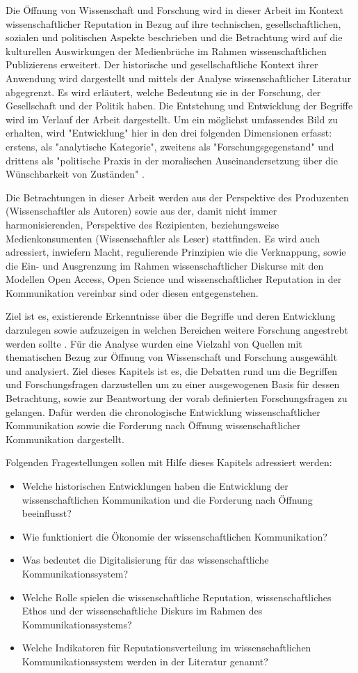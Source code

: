 Die Öffnung von Wissenschaft und Forschung wird in dieser Arbeit im Kontext wissenschaftlicher Reputation in Bezug auf ihre technischen, gesellschaftlichen, sozialen und politischen Aspekte beschrieben und die Betrachtung wird auf die kulturellen Auswirkungen der Medienbrüche im Rahmen wissenschaftlichen Publizierens erweitert. Der historische und gesellschaftliche Kontext ihrer Anwendung wird dargestellt und mittels der Analyse wissenschaftlicher Literatur abgegrenzt. Es wird erläutert, welche Bedeutung sie in der Forschung, der Gesellschaft und der Politik haben. Die Entstehung und Entwicklung der Begriffe wird im Verlauf der Arbeit dargestellt. Um ein möglichst umfassendes Bild zu erhalten, wird "Entwicklung" hier in den drei folgenden Dimensionen erfasst: erstens, als "analytische Kategorie", zweitens als "Forschungsgegenstand" und drittens als "politische Praxis in der moralischen Auseinandersetzung über die Wünschbarkeit von Zuständen" \cite{cite:10}.

Die Betrachtungen in dieser Arbeit werden aus der Perspektive des Produzenten (Wissenschaftler als Autoren) sowie aus der, damit nicht immer harmonisierenden, Perspektive des Rezipienten, beziehungsweise Medienkonsumenten (Wissenschaftler als Leser) stattfinden. Es wird auch adressiert, inwiefern Macht, regulierende Prinzipien wie die Verknappung, sowie die Ein- und Ausgrenzung im Rahmen wissenschaftlicher Diskurse mit den Modellen Open Access, Open Science und wissenschaftlicher Reputation in der Kommunikation vereinbar sind oder diesen entgegenstehen.

Ziel ist es, existierende Erkenntnisse über die Begriffe und deren Entwicklung darzulegen sowie aufzuzeigen in welchen Bereichen weitere Forschung angestrebt werden sollte \cite{webster2002analyzing}. Für die Analyse wurden eine Vielzahl von Quellen mit thematischen Bezug zur Öffnung von Wissenschaft und Forschung ausgewählt und analysiert. Ziel dieses Kapitels ist es, die Debatten rund um die Begriffen und Forschungsfragen darzustellen um zu einer ausgewogenen Basis für dessen Betrachtung, sowie zur Beantwortung der vorab definierten Forschungsfragen zu gelangen. Dafür werden die chronologische Entwicklung wissenschaftlicher Kommunikation sowie die Forderung nach Öffnung wissenschaftlicher Kommunikation dargestellt.

Folgenden Fragestellungen sollen mit Hilfe dieses Kapitels adressiert werden:
\begin{itemize}
\item Welche historischen Entwicklungen haben die Entwicklung der wissenschaftlichen Kommunikation und die Forderung nach Öffnung beeinflusst?
\item Wie funktioniert die Ökonomie der wissenschaftlichen Kommunikation?
\item Was bedeutet die Digitalisierung für das wissenschaftliche Kommunikationssystem?
\item Welche Rolle spielen die wissenschaftliche Reputation, wissenschaftliches Ethos und der wissenschaftliche Diskurs im Rahmen des Kommunikationssystems?
\item Welche Indikatoren für Reputationsverteilung im wissenschaftlichen Kommunikationssystem werden in der Literatur genannt?
\end{itemize}

